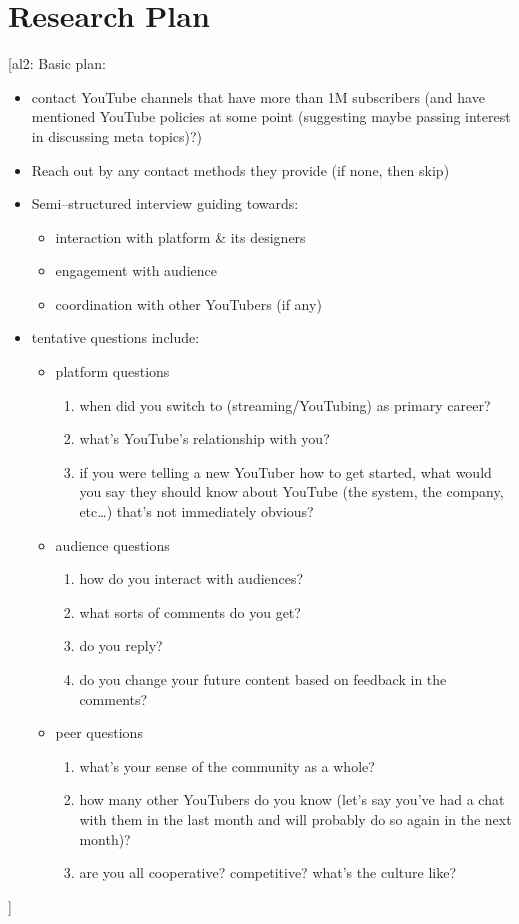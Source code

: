 \documentclass[10pt]{article}
\newcommand{\ali}[1]{{\color{Red}[al2: #1]}}
\begin{document}
\section*{Research Plan}
\ali{Basic plan:
\begin{itemize}
  \item contact YouTube channels that have more than 1M subscribers
        (and have mentioned YouTube policies at some point
          (suggesting maybe passing interest in discussing meta topics)?)
  \item Reach out by any contact methods they provide (if none, then skip)
  \item Semi--structured interview guiding towards:
  \begin{itemize}
    \item interaction with platform \& its designers
    \item engagement with audience
    \item coordination with other YouTubers (if any)
  \end{itemize}
  \item tentative questions include:
  \begin{itemize}
    \item platform questions
    \begin{enumerate}
      \item when did you switch to (streaming/YouTubing) as primary career?
      \item what's YouTube's relationship with you?
      \item if you were telling a new YouTuber how to get started,
            what would you say they should know about YouTube
            (the system, the company, etc\dots)
            that's not immediately obvious?
    \end{enumerate}
    \item audience questions
    \begin{enumerate}
      \item how do you interact with audiences?
      \item what sorts of comments do you get?
      \item do you reply?
      \item do you change your future content based on feedback in the comments?
    \end{enumerate}
    \item peer questions
    \begin{enumerate}
      \item what's your sense of the community as a whole?
      \item how many other YouTubers do you know
            (let's say you've had a chat with them in the last month and
             will probably do so again in the next month)?
      \item are you all cooperative? competitive? what's the culture like?
    \end{enumerate}
  \end{itemize}
\end{itemize}
}
\end{document}
